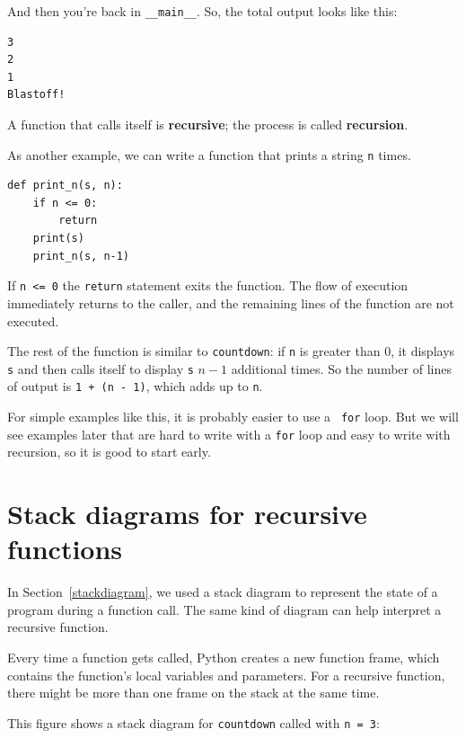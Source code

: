 \documentclass[10pt]{book}
\begin{document}
And then you're back in \verb"__main__".  So, the
total output looks like this:

\beforeverb
\begin{verbatim}
3
2
1
Blastoff!
\end{verbatim}
\afterverb
%
A function that calls itself is {\bf recursive}; the process is
called {\bf recursion}.


As another example, we can write a function that prints a
string {\tt n} times.

\beforeverb
\begin{verbatim}
def print_n(s, n):
    if n <= 0:
        return
    print(s)
    print_n(s, n-1)
\end{verbatim}
\afterverb
%
If {\tt n <= 0} the {\tt return} statement exits the function.  The
flow of execution immediately returns to the caller, and the remaining
lines of the function are not executed.


The rest of the function is similar to {\tt countdown}: if {\tt n} is
greater than 0, it displays {\tt s} and then calls itself to display
{\tt s} $n-1$ additional times.  So the number of lines of output
is {\tt 1 + (n - 1)}, which adds up to
{\tt n}.

For simple examples like this, it is probably easier to use a {\tt
for} loop.  But we will see examples later that are hard to write
with a {\tt for} loop and easy to write with recursion, so it is
good to start early.



\section{Stack diagrams for recursive functions}

In Section~\ref{stackdiagram}, we used a stack diagram to represent
the state of a program during a function call.  The same kind of
diagram can help interpret a recursive function.

Every time a function gets called, Python creates a new function
frame, which contains the function's local variables and parameters.
For a recursive function, there might be more than one frame on the
stack at the same time.

This figure shows a stack diagram for {\tt countdown} called with
{\tt n = 3}:
\end{document}
